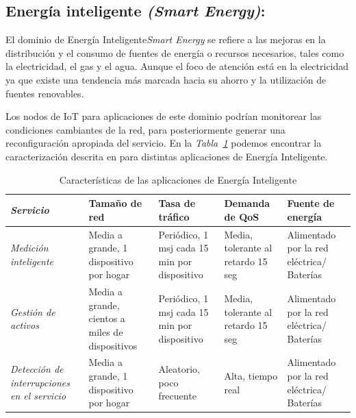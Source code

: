 \subsection{Energía inteligente \textit{(Smart Energy)}:}

El dominio de Energía Inteligente\textit{Smart Energy }se refiere a las mejoras en la distribución y el consumo de fuentes de energía o recursos necesarios, tales como la electricidad, el gas y el agua. Aunque el foco de atención está en la electricidad ya que existe una tendencia más marcada hacia su ahorro y la utilización de fuentes renovables. \newline

Los nodos de IoT para aplicaciones de este dominio podrían monitorear las condiciones cambiantes de la red, para posteriormente generar una reconfiguración apropiada del servicio. En la \textit{Tabla~\ref{tab:smartenergy}} podemos encontrar la caracterización descrita en \parencite{NetTrafficIoT} para distintas aplicaciones de Energía Inteligente.\newline

\begin{table}
\caption{Características de las aplicaciones de Energía Inteligente}
\label{tab:smartenergy}
\centering


\begin{tabular}{*{5}{m{3cm}}}  \\  
\textbf{\textit{Servicio}} & \textbf{Tamaño de red} & \textbf{Tasa de tráfico} & \textbf{Demanda de QoS} & \textbf{Fuente de energía} \\ \hline
\textit{Medición inteligente}  & \footnotesize{ Media a grande, 1 dispositivo por hogar } & \footnotesize{ Periódico, 1 msj cada 15 min por dispositivo } & \footnotesize{ Media, tolerante al retardo 15 seg } & \footnotesize{ Alimentado por la red eléctrica/ Baterías } \\ \hline 
\textit{Gestión de activos}  & \footnotesize{ Media a grande, cientos a miles de dispositivos } & \footnotesize{ Periódico, 1 msj cada 15 min por dispositivo } & \footnotesize{ Media, tolerante al retardo 15 seg } & \footnotesize{ Alimentado por la red eléctrica/ Baterías } \\ \hline 
\textit{Detección de interrupciones en el servicio } & \footnotesize{ Media a grande, 1 dispositivo por hogar } & \footnotesize{ Aleatorio, poco frecuente } & \footnotesize{ Alta, tiempo real } & \footnotesize{ Alimentado por la red eléctrica/ Baterías } \\ 
\end{tabular}
\end{table}

